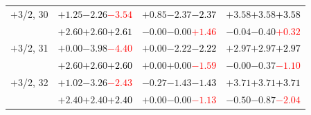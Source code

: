 \documentclass[compress]{beamer}
\begin{document}
\begin{frame}
\begin{tabular}{r | c | c | c}
$+$3/2, 30 & $+1.25$\hspace{0.1 cm}$-2.26$\hspace{0.1 cm}\textcolor{red}{$-3.54$} & $+0.85$\hspace{0.1 cm}$-2.37$\hspace{0.1 cm}\textcolor{black}{$-2.37$} & $+3.58$\hspace{0.1 cm}$+3.58$\hspace{0.1 cm}\textcolor{black}{$+3.58$} \\
           & $+2.60$\hspace{0.1 cm}$+2.60$\hspace{0.1 cm}\textcolor{black}{$+2.61$} & $-0.00$\hspace{0.1 cm}$-0.00$\hspace{0.1 cm}\textcolor{red}{$+1.46$} & $-0.04$\hspace{0.1 cm}$-0.40$\hspace{0.1 cm}\textcolor{red}{$+0.32$} \\
$+$3/2, 31 & $+0.00$\hspace{0.1 cm}$-3.98$\hspace{0.1 cm}\textcolor{red}{$-4.40$} & $+0.00$\hspace{0.1 cm}$-2.22$\hspace{0.1 cm}\textcolor{black}{$-2.22$} & $+2.97$\hspace{0.1 cm}$+2.97$\hspace{0.1 cm}\textcolor{black}{$+2.97$} \\
           & $+2.60$\hspace{0.1 cm}$+2.60$\hspace{0.1 cm}\textcolor{black}{$+2.60$} & $+0.00$\hspace{0.1 cm}$+0.00$\hspace{0.1 cm}\textcolor{red}{$-1.59$} & $-0.00$\hspace{0.1 cm}$-0.37$\hspace{0.1 cm}\textcolor{red}{$-1.10$} \\
$+$3/2, 32 & $+1.02$\hspace{0.1 cm}$-3.26$\hspace{0.1 cm}\textcolor{red}{$-2.43$} & $-0.27$\hspace{0.1 cm}$-1.43$\hspace{0.1 cm}\textcolor{black}{$-1.43$} & $+3.71$\hspace{0.1 cm}$+3.71$\hspace{0.1 cm}\textcolor{black}{$+3.71$} \\
           & $+2.40$\hspace{0.1 cm}$+2.40$\hspace{0.1 cm}\textcolor{black}{$+2.40$} & $+0.00$\hspace{0.1 cm}$-0.00$\hspace{0.1 cm}\textcolor{red}{$-1.13$} & $-0.50$\hspace{0.1 cm}$-0.87$\hspace{0.1 cm}\textcolor{red}{$-2.04$} \\

\end{tabular}
\end{frame}
\end{document}
